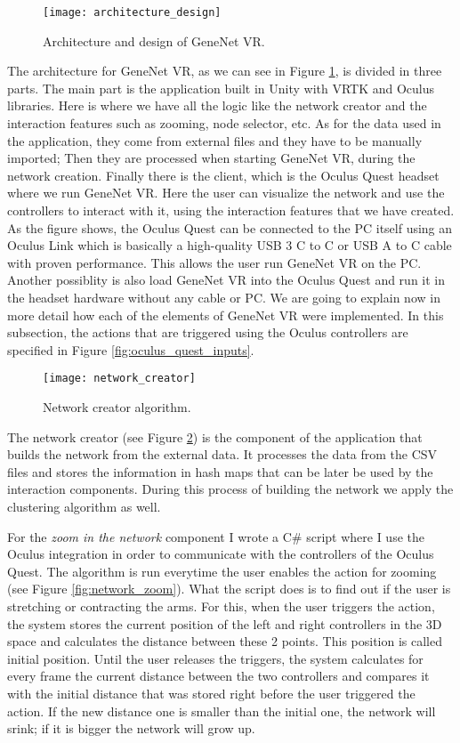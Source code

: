 \begin{figure}[h!]
    \centering%
    \texttt{[image: architecture\_design]}
    \caption{Architecture and design of GeneNet VR.}
    \label{fig:architecture_design}
\end{figure}%

The architecture for GeneNet VR, as we can see in Figure \ref{fig:architecture_design}, is divided in three parts. The main part is the application built in Unity with VRTK and Oculus libraries. Here is where we have all the logic like the network creator and the interaction features such as zooming, node selector, etc. As for the data used in the application, they come from external files and they have to be manually imported; Then they are processed when starting GeneNet VR, during the network creation. Finally there is the client, which is the Oculus Quest headset where we run GeneNet VR. Here the user can visualize the network and use the controllers to interact with it, using the interaction features that we have created. As the figure shows, the Oculus Quest can be connected to the PC itself using an Oculus Link which is basically a high-quality USB 3 C to C or USB A to C cable with proven performance\cite{oculus_link}. This allows the user run GeneNet VR on the PC. Another possiblity is also load GeneNet VR into the Oculus Quest and run it in the headset hardware without any cable or PC. We are going to explain now in more detail how each of the elements of GeneNet VR were implemented. In this subsection, the actions that are triggered using the Oculus controllers are specified in Figure \ref{fig:oculus_quest_inputs}.

\begin{figure}[h!]
    \centering%
    \texttt{[image: network\_creator]}
    \caption{Network creator algorithm.}
    \label{fig:network_creator}
\end{figure}%

The network creator (see Figure \ref{fig:network_creator}) is the component of the application that builds the network from the external data. It processes the data from the CSV files and stores the information in hash maps that can be later be used by the interaction components. During this process of building the network we apply the clustering algorithm as well.

For the \textit{zoom in the network} component I wrote a C\# script where I use the Oculus integration in order to communicate with the controllers of the Oculus Quest. The algorithm is run everytime the user enables the action for zooming (see Figure \ref{fig:network_zoom}). What the script does is to find out if the user is stretching or contracting the arms. For this, when the user triggers the action, the system stores the current position of the left and right controllers in the 3D space and calculates the distance between these 2 points. This position is called initial position. Until the user releases the triggers, the system calculates for every frame the current distance between the two controllers and compares it with the initial distance that was stored right before the user triggered the action. If the new distance one is smaller than the initial one, the network will srink; if it is bigger the network will grow up.

